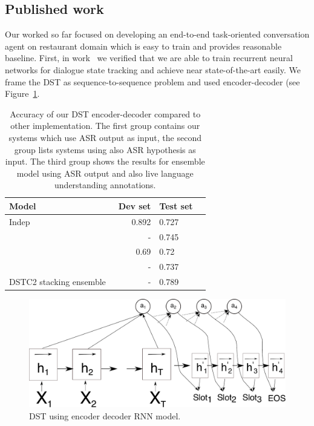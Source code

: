 \documentclass[11pt]{article}
\begin{document}
\subsection{Published work}
Our worked so far focused on developing an end-to-end task-oriented conversation agent on restaurant domain which is easy to train and provides reasonable baseline.
First, in work~\cite{platek_recurrent_2016} we verified that we are able to train recurrent neural networks for dialogue state tracking and achieve near state-of-the-art easily. 
We frame the DST as sequence-to-sequence problem and used encoder-decoder (see Figure~\ref{fig:dst_seq2seq}. 

\begin{table}[tb]\vspace{-1mm}
\begin{center}
\begin{tabular}{l@{\quad}rll}
\hline
Model & Dev set & Test set\\
[2pt] \hline\rule{0pt}{12pt}
    Indep  &   0.892 & 0.727 \\
\hline
    \cite{vodolan_hybrid_2015} & - & 0.745 \\
    \cite{zilka_incremental_2015} & 0.69 & 0.72 \\
    \cite{henderson2013deep} & - & 0.737 \\
\hline
    DSTC2 stacking ensemble~\cite{henderson2014second} & - & 0.789 \\
\hline
\end{tabular}
\caption{Accuracy of our DST encoder-decoder compared to other implementation. The first group contains our systems which use ASR output as input, the second group lists systems using also ASR hypothesis as input. The third group shows the results for ensemble model using ASR output and also live language understanding annotations.}
\end{center}
\label{tab:dstc}
\end{table}

\begin{figure}[htpb]
    \centering
    \includegraphics[width=1.0\linewidth]{dst_seq2seq}
    \caption{DST using encoder decoder RNN model.}
    \label{fig:dst_seq2seq}
\end{figure}
\end{document}
